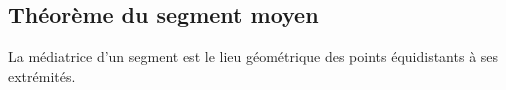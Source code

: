 \documentclass[a4paper,12pt]{article}
\begin{document}
\pagebreak
\subsection{Théorème du segment moyen}
\begin{theorem}
La médiatrice d'un segment est le lieu géométrique des points équidistants à ses extrémités.
\end{theorem}
\end{document}
